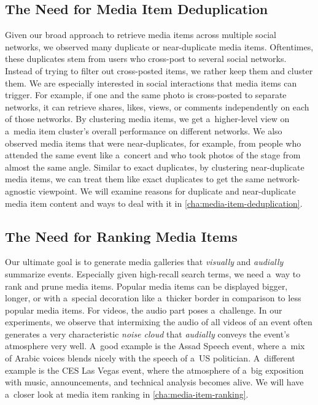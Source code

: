 \subsection{The Need for Media Item Deduplication}
\label{sec:the-need-for-media-item-deduplication}

Given our broad approach to retrieve media items
across multiple social networks,
we observed many duplicate or near-duplicate media items.
Oftentimes, these duplicates stem from users who
cross-post to several social networks.
Instead of trying to filter out cross-posted items,
we rather keep them and cluster them.
We are especially interested in social interactions
that media items can trigger.
For example, if one and the same photo
is cross-posted to separate networks,
it can retrieve shares, likes, views, or comments
independently on each of those networks.
By clustering media items, we get a~higher-level view on
a~media item cluster's overall performance on different networks.
We also observed media items that were near-duplicates,
for example, from people who attended the same event like a~concert
and who took photos of the stage from almost the same angle.
Similar to exact duplicates,
by clustering near-duplicate media items,
we can treat them like exact duplicates to get the same
network-agnostic viewpoint.
We will examine reasons for duplicate and near-duplicate
media item content and ways to deal with it in \autoref{cha:media-item-deduplication}.

\subsection{The Need for Ranking Media Items}

Our ultimate goal is to generate media galleries
that \emph{visually} and \emph{audially} summarize events.
Especially given high-recall search terms,
we need a~way to rank and prune media items.
Popular media items can be displayed bigger, longer,
or with a~special decoration like a~thicker border
in comparison to less popular media items.
For videos, the audio part poses a~challenge.
In our experiments, we observe that intermixing the audio
of all videos of an event often generates
a very characteristic \emph{noise cloud}
that \emph{audially} conveys the event's atmosphere very well.
A~good example is the Assad Speech event,
where a~mix of Arabic voices blends nicely
with the speech of a~US politician.
A~different example is the CES Las Vegas event,
where the atmosphere of a~big exposition with music,
announcements, and technical analysis becomes alive.
We will have a~closer look at media item ranking in
\autoref{cha:media-item-ranking}.

